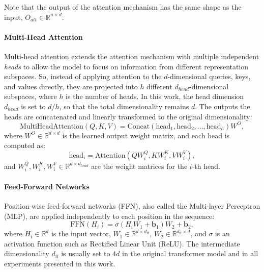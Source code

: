 Note that the output of the attention mechanism has the same shape as the input, $O_{att} \in \mathbb{R}^{n \times d}$.

\paragraph{Multi-Head Attention}
Multi-head attention extends the attention mechanism with multiple independent \emph{heads} to allow the model to focus on information from different representation subspaces. So, instead of applying attention to the $d$-dimensional queries, keys, and values directly, they are projected into $h$ different $d_{head}$-dimensional subspaces, where $h$ is the number of heads. In this work, the head dimension $d_{head}$ is set to $d/h$, so that the total dimensionality remains $d$. The outputs the heads are concatenated and linearly transformed to the original dimensionality:
\begin{equation*}
    \text{MultiHeadAttention}(Q, K, V) = \text{Concat}(\text{head}_1, \text{head}_2, \dots, \text{head}_h) W^O,
\end{equation*}
where $W^O \in \mathbb{R}^{d \times d}$ is the learned output weight matrix, and each head is computed as:
\begin{equation*}
    \text{head}_i = \text{Attention}(Q W_i^Q, K W_i^K, V W_i^V),
\end{equation*}
and $W_i^Q, W_i^K, W_i^V \in \mathbb{R}^{d \times d_{head}}$ are the weight matrices for the $i$-th head.

\paragraph{Feed-Forward Networks}

Position-wise feed-forward networks (FFN), also called the Multi-layer Perceptron (MLP), are applied independently to each position in the sequence:
\begin{equation*}
    \text{FFN}(H_i) = \sigma(H_i W_1 + \mathbf{b}_1) W_2 + \mathbf{b}_2,
\end{equation*}
where $H_i \in \mathbb{R}^d$ is the input vector, $W_1 \in \mathbb{R}^{d \times d_{\text{ff}}}$, $W_2 \in \mathbb{R}^{d_{\text{ff}} \times d}$, and $\sigma$ is an activation function such as Rectified Linear Unit (ReLU). The intermediate dimensionality $d_{\text{ff}}$ is usually set to $4d$ in the original transformer model and in all experiments presented in this work.

